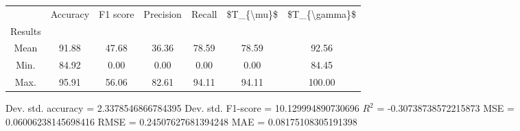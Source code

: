 \begin{tabular}{|c|c|c|c|c|c|c|}
\toprule
{} &  Accuracy &  F1 score &  Precision &  Recall &  \$T\_\{\textbackslash mu\}\$ &  \$T\_\{\textbackslash gamma\}\$ \\
Results &           &           &            &         &            &               \\
\hline
Mean    &     91.88 &     47.68 &      36.36 &   78.59 &      78.59 &         92.56 \\
Min.    &     84.92 &      0.00 &       0.00 &    0.00 &       0.00 &         84.45 \\
Max.    &     95.91 &     56.06 &      82.61 &   94.11 &      94.11 &        100.00 \\
\bottomrule
\end{tabular}

 Dev. std. accuracy = 2.3378546866784395
 Dev. std. F1-score = 10.129994890730696
 $R^2$ = -0.30738738572215873
 MSE = 0.06006238145698416
 RMSE = 0.24507627681394248
 MAE = 0.08175108305191398